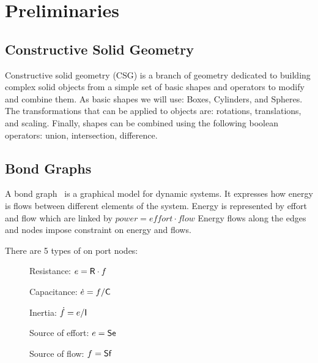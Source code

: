 \section{Preliminaries}
\label{sec:prelim}

\subsection{Constructive Solid Geometry}

Constructive solid geometry (CSG) is a branch of geometry dedicated to building complex solid objects from a simple set of basic shapes and operators to modify and combine them.
As basic shapes we will use: Boxes, Cylinders, and Spheres.
The transformations that can be applied to objects are: rotations, translations, and scaling.
Finally, shapes can be combined using the following boolean operators: union, intersection, difference.


\subsection{Bond Graphs}
A bond graph~\cite{Paynter} is a graphical model for dynamic systems.
It expresses how energy is flows between different elements of the system.
Energy is represented by effort and flow which are linked by $\mathit{power} = \mathit{effort} \cdot \mathit{flow}$
Energy flows along the edges and nodes impose constraint on energy and flows. 

There are 5 types of on port nodes:
\begin{description}
\item[\bgR]  Resistance: $e = \mathsf{R} \cdot f$
\item[\bgC]  Capacitance: $\dot{e} = f/\mathsf{C}$
\item[\bgI]  Inertia: $\dot{f} = e/\mathsf{I}$
\item[\bgSe] Source of effort: $e = \mathsf{Se}$
\item[\bgSf] Source of flow: $f = \mathsf{Sf}$
\end{description}

